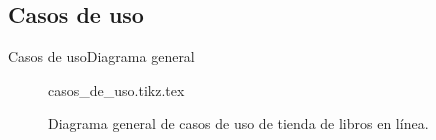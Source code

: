 %
%
%

\subsection{Casos de uso}

\begin{frame}{Casos de uso}{Diagrama general}
  
  \begin{figure}
    \begin{center}
      {casos_de_uso.tikz.tex}
      \caption{Diagrama general de casos de uso de tienda de libros en línea.}
    \end{center}
  \end{figure}


\end{frame}
